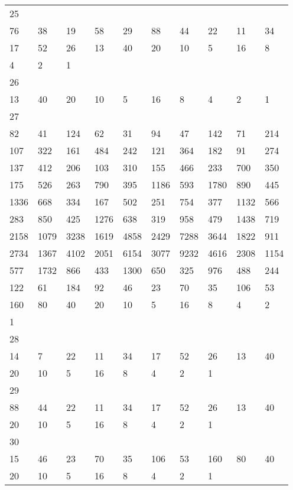 \begin{longtable}{*{10}{l}}
25&&&&&&&&&\\
76& 38& 19& 58& 29& 88& 44& 22& 11& 34\\
17& 52& 26& 13& 40& 20& 10& 5& 16& 8\\
4& 2& 1& \\

26&&&&&&&&&\\
13& 40& 20& 10& 5& 16& 8& 4& 2& 1\\

27&&&&&&&&&\\
82& 41& 124& 62& 31& 94& 47& 142& 71& 214\\
107& 322& 161& 484& 242& 121& 364& 182& 91& 274\\
137& 412& 206& 103& 310& 155& 466& 233& 700& 350\\
175& 526& 263& 790& 395& 1186& 593& 1780& 890& 445\\
1336& 668& 334& 167& 502& 251& 754& 377& 1132& 566\\
283& 850& 425& 1276& 638& 319& 958& 479& 1438& 719\\
2158& 1079& 3238& 1619& 4858& 2429& 7288& 3644& 1822& 911\\
2734& 1367& 4102& 2051& 6154& 3077& 9232& 4616& 2308& 1154\\
577& 1732& 866& 433& 1300& 650& 325& 976& 488& 244\\
122& 61& 184& 92& 46& 23& 70& 35& 106& 53\\
160& 80& 40& 20& 10& 5& 16& 8& 4& 2\\
1& \\

28&&&&&&&&&\\
14& 7& 22& 11& 34& 17& 52& 26& 13& 40\\
20& 10& 5& 16& 8& 4& 2& 1& \\

29&&&&&&&&&\\
88& 44& 22& 11& 34& 17& 52& 26& 13& 40\\
20& 10& 5& 16& 8& 4& 2& 1& \\

30&&&&&&&&&\\
15& 46& 23& 70& 35& 106& 53& 160& 80& 40\\
20& 10& 5& 16& 8& 4& 2& 1& \\


\end{longtable}
